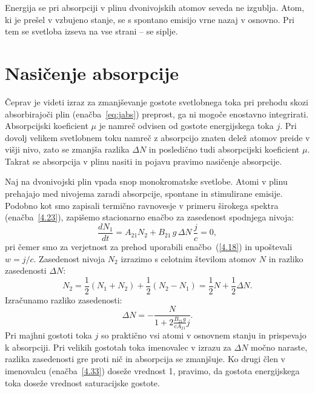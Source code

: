 \begin{remark}
Energija se pri absorpciji v plinu dvonivojskih atomov seveda
ne izgublja. Atom, ki je prešel v vzbujeno stanje, se s spontano 
emisijo vrne nazaj v osnovno. Pri tem se svetloba izseva na vse strani -- se siplje. 
\end{remark}

\section{Nasičenje absorpcije}
\label{chap:NasAbs}
Čeprav je videti izraz za zmanjševanje 
gostote svetlobnega toka pri prehodu skozi absorbirajoči plin (enačba~\ref{eq:jabs}) 
preprost, ga ni mogoče enostavno integrirati. Absorpcijski koeficient 
$\mu$ je namreč odvisen od 
gostote energijskega toka $j$. Pri dovolj velikem svetlobnem toku namreč z 
absorpcijo znaten delež atomov preide v višji nivo, zato se zmanjša razlika $\Delta N$
in posledično tudi absorpcijski koeficient $\mu$. Takrat se absorpcija
v plinu nasiti in pojavu pravimo nasičenje absorpcije.

Naj na dvonivojski plin vpada snop monokromatske svetlobe. 
Atomi v plinu prehajajo med nivojema zaradi absorpcije, spontane in stimulirane emisije. 
Podobno kot smo zapisali termično ravnovesje v primeru
širokega spektra (enačba~\ref{4.23}), zapišemo stacionarno enačbo za
zasedenost spodnjega nivoja:
\begin{equation}
\frac{dN_{1}}{dt}=A_{21}N_{2}+B_{21}\,g\,\Delta N\,\frac{j}{c}=0,
\label{4.32}
\end{equation}
pri čemer smo za verjetnost za prehod uporabili
enačbo~(\ref{4.18}) in upoštevali $w=j/c$. Zasedenost nivoja $N_{2}$ izrazimo s 
celotnim številom atomov $N$ in razliko zasedenosti $\Delta N$:
\begin{equation}
N_{2}=\frac{1}{2}(N_1+N_2) + \frac{1}{2}(N_2-N_1) = \frac{1}{2}N+\frac{1}{2}\Delta N.
\label{4.321}
\end{equation}
Izračunamo razliko zasedenosti:
\begin{equation}
\Delta N=-\frac{N}{1+2\frac{B_{21}g}{cA_{21}}j}.
\label{4.33}
\end{equation}
Pri majhni gostoti toka $j$ so praktično vsi atomi v osnovnem stanju in prispevajo
k absorpciji. Pri velikih gostotah toka  imenovalec v izrazu za $\Delta N$
močno naraste, razlika zasedenosti gre proti nič in absorpcija se zmanjšuje.
Ko drugi člen v imenovalcu (enačba~\ref{4.33}) doseže vrednost 1, pravimo, da
gostota energijskega toka doseže vrednost saturacijske gostote.


